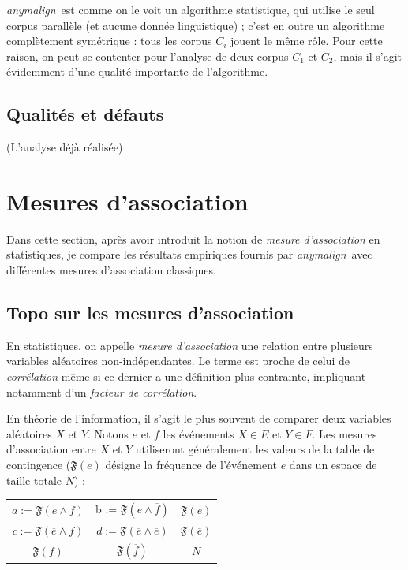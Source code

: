 \documentclass[a4paper,10pt]{article}
\newcommand{\anym}{\emph{anymalign}}
\begin{document}
\anym~est comme on le voit un algorithme statistique, qui utilise le seul corpus parallèle (et aucune donnée linguistique) ; c'est en outre un algorithme complètement symétrique : tous les corpus $C_i$ jouent le même rôle. Pour cette raison, on peut se contenter pour l'analyse de deux corpus $C_1$ et $C_2$, mais il s'agit évidemment d'une qualité importante de l'algorithme.


\subsection{Qualités et défauts}
(L'analyse déjà réalisée)


\section{Mesures d'association}

Dans cette section, après avoir introduit la notion de \emph{mesure d'association} en statistiques, je compare les résultats empiriques fournis par \anym~avec différentes mesures d'association classiques.

\subsection{Topo sur les mesures d'association}

En statistiques, on appelle \emph{mesure d'association} une relation entre plusieurs variables aléatoires non-indépendantes. Le terme est proche de celui de \emph{corrélation} même si ce dernier a une définition plus contrainte, impliquant notamment d'un \emph{facteur de corrélation}.

En théorie de l'information, il s'agit le plus souvent de comparer deux variables aléatoires $X$ et $Y$. Notons $e$ et $f$ les événements $X \in E$ et $Y \in F$. Les mesures d'association entre $X$ et $Y$ utiliseront généralement les valeurs de la table de contingence ($\mathfrak{F}(e)$ désigne la fréquence de l'événement $e$ dans un espace de taille totale $N$) :

\begin{tabular}{|cc|c|}
\hline
$a := \mathfrak{F}(e\wedge f)$ & b := $\mathfrak{F}(e\wedge\overline{f})$ & $\mathfrak{F}(e)$ \\
$c := \mathfrak{F}(\overline{e}\wedge f)$ & $d := \mathfrak{F}(\overline{e}\wedge\overline{e})$ & $\mathfrak{F}(\overline{e})$ \\
\hline
$\mathfrak{F}(f)$ & $\mathfrak{F}(\overline{f})$ & $N$ \\
\hline
\end{tabular}
\end{document}
